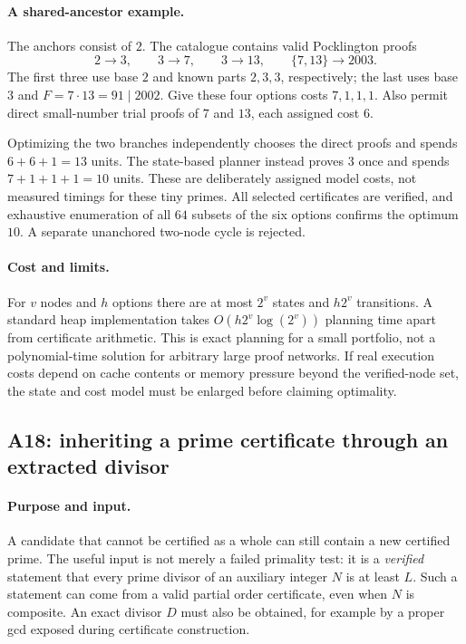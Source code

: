\documentclass[11pt,a4paper]{article}
\theoremstyle{definition}\newtheorem{definition}[theorem]{Definition}
\theoremstyle{remark}\newtheorem{remark}[theorem]{Remark}
\begin{document}
\paragraph{A shared-ancestor example.}
The anchors consist of $2$.  The catalogue contains valid Pocklington
proofs
\[
 2\longrightarrow3,\qquad3\longrightarrow7,\qquad
 3\longrightarrow13,\qquad\{7,13\}\longrightarrow2003.
\]
The first three use base $2$ and known parts $2,3,3$, respectively; the
last uses base $3$ and $F=7\cdot13=91\mid2002$.  Give these four options
costs $7,1,1,1$.  Also permit direct small-number trial proofs of $7$ and
$13$, each assigned cost $6$.

Optimizing the two branches independently chooses the direct proofs and
spends $6+6+1=13$ units.  The state-based planner instead proves $3$ once
and spends $7+1+1+1=10$ units.  These are deliberately assigned model
costs, not measured timings for these tiny primes.  All selected
certificates are verified, and exhaustive enumeration of all $64$
subsets of the six options confirms the optimum $10$.  A separate
unanchored two-node cycle is rejected.

\paragraph{Cost and limits.}
For $v$ nodes and $h$ options there are at most $2^v$ states and
$h2^v$ transitions.  A standard heap implementation takes
$O(h2^v\log(2^v))$ planning time apart from certificate arithmetic.
This is exact planning for a small portfolio, not a polynomial-time
solution for arbitrary large proof networks.  If real execution costs
depend on cache contents or memory pressure beyond the verified-node set,
the state and cost model must be enlarged before claiming optimality.

\subsection{A18: inheriting a prime certificate through an extracted divisor}
\label{alg:A18}

\paragraph{Purpose and input.}
A candidate that cannot be certified as a whole can still contain a new
certified prime.  The useful input is not merely a failed primality test:
it is a \emph{verified} statement that every prime divisor of an auxiliary
integer $N$ is at least $L$.  Such a statement can come from a valid
partial order certificate, even when $N$ is composite.  An exact divisor
$D$ must also be obtained, for example by a proper gcd exposed during
certificate construction.
\end{document}

